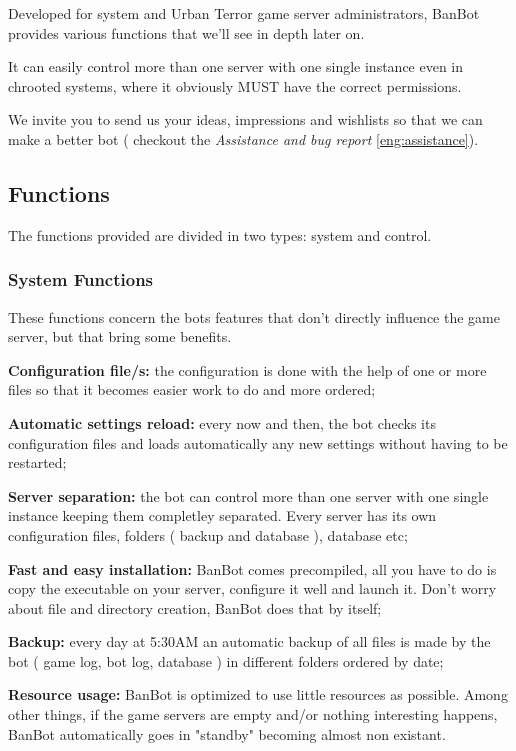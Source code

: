 \documentclass[a4paper]{article}
\begin{document}
Developed for system and Urban Terror game server administrators, BanBot provides various functions that we'll see in depth later on.

It can easily control more than one server with one single instance even in chrooted systems, where it obviously MUST have the correct permissions.

We invite you to send us your ideas, impressions and wishlists so that we can make a better bot ( checkout the \textit{Assistance and bug report} \ref{eng:assistance}).


\subsection {Functions}
The functions provided are divided in two types: system and control.

\subsubsection {System Functions}
These functions concern the bots features that don't directly influence the game server, but that bring some benefits.
\begin{description}
\item{\textbf{Configuration file/s:}} the configuration is done with the help of one or more files so that it becomes easier work to do and more ordered;
\item{\textbf{Automatic settings reload:}} every now and then, the bot checks its configuration files and loads automatically any new settings without having to be restarted;
\item{\textbf{Server separation:}} the bot can control more than one server with one single instance keeping them completley separated. Every server has its own
configuration files, folders ( backup and database ), database etc;
\item{\textbf{Fast and easy installation:}} BanBot comes precompiled, all you have to do is copy the executable on your server, configure it well and launch it. Don't
worry about file and directory creation, BanBot does that by itself;
\item{\textbf{Backup:}} every day at 5:30AM an automatic backup of all files is made by the bot ( game log, bot log, database ) in different folders ordered by date;
\item{\textbf{Resource usage:}} BanBot is optimized to use little resources as possible. Among other things, if the game servers are empty and/or nothing interesting happens,
BanBot automatically goes in "standby" becoming almost non existant.
\end{description}
\end{document}
